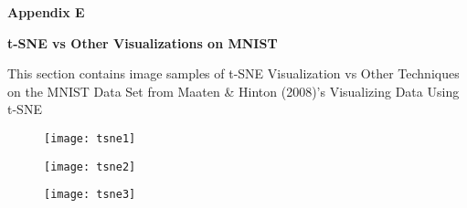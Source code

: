 %
%
%                 

\textbf{\Huge Appendix E}
\bigskip

\textbf{\LARGE t-SNE vs Other Visualizations on MNIST}

\bigskip
This section contains image samples of  t-SNE Visualization vs Other Techniques on the MNIST Data Set from Maaten \& Hinton (2008)'s Visualizing Data Using t-SNE

\begin{figure}[h]
\centering
\texttt{[image: tsne1]}
\end{figure}

\begin{figure}[h]
\centering
\texttt{[image: tsne2]}
\end{figure}

\begin{figure}[h]
\centering
\texttt{[image: tsne3]}
\end{figure}


